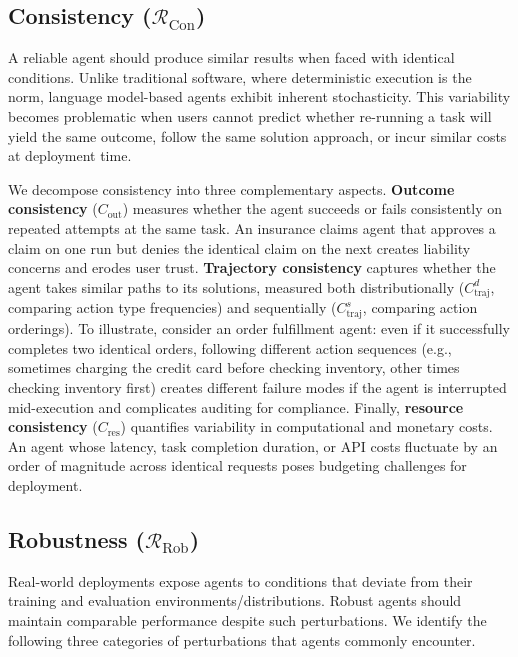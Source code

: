 \documentclass[11pt]{article}
\begin{document}
\subsection{Consistency ($\mathcal{R}_{\text{Con}}$)}

A reliable agent should produce similar results when faced with identical conditions. Unlike traditional software, where deterministic execution is the norm, language model-based agents exhibit inherent stochasticity. This variability becomes problematic when users cannot predict whether re-running a task will yield the same outcome, follow the same solution approach, or incur similar costs at deployment time.

We decompose consistency into three complementary aspects. \textbf{Outcome consistency} ($C_{\text{out}}$) measures whether the agent succeeds or fails consistently on repeated attempts at the same task. An insurance claims agent that approves a claim on one run but denies the identical claim on the next creates liability concerns and erodes user trust. \textbf{Trajectory consistency} captures whether the agent takes similar paths to its solutions, measured both distributionally ($C_{\text{traj}}^d$, comparing action type frequencies) and sequentially ($C_{\text{traj}}^s$, comparing action orderings). To illustrate, consider an order fulfillment agent: even if it successfully completes two identical orders, following different action sequences (e.g., sometimes charging the credit card before checking inventory, other times checking inventory first) creates different failure modes if the agent is interrupted mid-execution and complicates auditing for compliance. Finally, \textbf{resource consistency} ($C_{\text{res}}$) quantifies variability in computational and monetary costs. An agent whose latency, task completion duration, or API costs fluctuate by an order of magnitude across identical requests poses budgeting challenges for deployment.

\subsection{Robustness ($\mathcal{R}_{\text{Rob}}$)}

Real-world deployments expose agents to conditions that deviate from their training and evaluation environments/distributions. Robust agents should maintain comparable performance despite such perturbations. We identify the following three categories of perturbations that agents commonly encounter.
\end{document}

